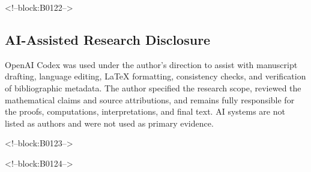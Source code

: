 \documentclass[11pt,a4paper]{article}
\theoremstyle{definition}
\begin{document}
<!--block:B0122-->
\subsection*{AI-Assisted Research Disclosure}
OpenAI Codex was used under the author's direction to assist with manuscript
drafting, language editing, \LaTeX{} formatting, consistency checks, and
verification of bibliographic metadata.  The author specified the research
scope, reviewed the mathematical claims and source attributions, and remains
fully responsible for the proofs, computations, interpretations, and final
text.  AI systems are not listed as authors and were not used as primary
evidence.

<!--block:B0123-->



<!--block:B0124-->
\end{document}

